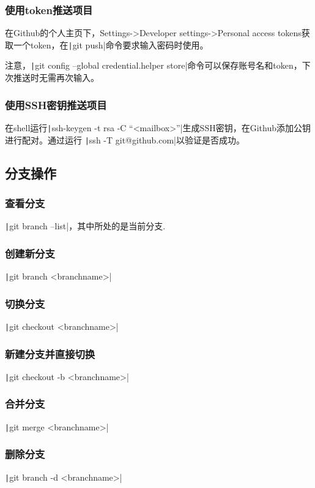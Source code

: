 \documentclass[fontset=ubuntu]{ctexart}
\begin{document}
\subsubsection{使用token推送项目}
在Github的个人主页下，Settings->Developer settings->Personal access tokens获取一个token，在\texttt|git push|命令要求输入密码时使用。

注意，\texttt|git config --global credential.helper store|命令可以保存账号名和token，下次推送时无需再次输入。

\subsubsection{使用SSH密钥推送项目}
在shell运行\texttt|ssh-keygen -t rsa -C “<mailbox>”|生成SSH密钥，在Github添加公钥进行配对。通过运行
\texttt|ssh -T git@github.com|以验证是否成功。

\subsection{分支操作}
\subsubsection{查看分支}
\texttt|git branch --list|，其中\*所处的是当前分支.

\subsubsection{创建新分支}
\texttt|git branch <branchname>|

\subsubsection{切换分支}
\texttt|git checkout <branchname>|

\subsubsection{新建分支并直接切换}
\texttt|git checkout -b <branchname>|

\subsubsection{合并分支}
\texttt|git merge <branchname>|

\subsubsection{删除分支}
\texttt|git branch -d <branchname>|
\end{document}
